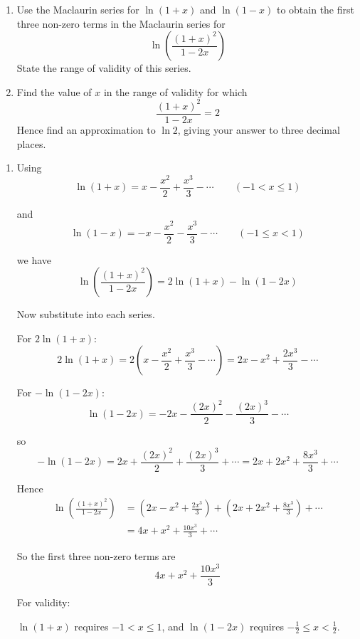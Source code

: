 \documentclass[leqno]{article}
\begin{document}
\begin{enumerate}[
  label=\textbf{\arabic*.},
  leftmargin=*,
  topsep=0pt,
  partopsep=0pt,
  parsep=0pt
]
\newpage

\questionitem

\begin{enumerate}[label=\textbf{(\roman*)}]
  \item Use the Maclaurin series for $\ln(1+x)$ and $\ln(1-x)$ to obtain the first three non-zero terms in the Maclaurin series for
  \[
  \ln\left(\frac{(1+x)^2}{1-2x}\right)
  \]
  State the range of validity of this series.  \\
  \item Find the value of $x$ in the range of validity for which
  \[
  \frac{(1+x)^2}{1-2x}=2
  \]
  Hence find an approximation to $\ln 2$, giving your answer to three decimal places.  \\
\end{enumerate}

\vspace*{10pt}

\begin{djsSolution}
\begin{enumerate}[label=\textbf{(\roman*)}]
\item Using
\[
\ln(1+x)=x-\frac{x^2}{2}+\frac{x^3}{3}-\cdots\qquad (-1<x\leq 1)
\]

and
\[
\ln(1-x)=-x-\frac{x^2}{2}-\frac{x^3}{3}-\cdots\qquad (-1\leq x<1)
\]

we have
\[
\ln\left(\frac{(1+x)^2}{1-2x}\right)=2\ln(1+x)-\ln(1-2x)
\]

Now substitute into each series.

For \(2\ln(1+x)\):
\[
2\ln(1+x)=2\left(x-\frac{x^2}{2}+\frac{x^3}{3}-\cdots\right)
=2x-x^2+\frac{2x^3}{3}-\cdots
\]

For \(-\ln(1-2x)\):
\[
\ln(1-2x)=-2x-\frac{(2x)^2}{2}-\frac{(2x)^3}{3}-\cdots
\]

so
\[
-\ln(1-2x)=2x+\frac{(2x)^2}{2}+\frac{(2x)^3}{3}+\cdots
=2x+2x^2+\frac{8x^3}{3}+\cdots
\]

Hence
\begin{align*}
\ln\left(\frac{(1+x)^2}{1-2x}\right)
&=\left(2x-x^2+\frac{2x^3}{3}\right)+\left(2x+2x^2+\frac{8x^3}{3}\right)+\cdots \\
&=4x+x^2+\frac{10x^3}{3}+\cdots
\end{align*}

So the first three non-zero terms are
\[
4x+x^2+\frac{10x^3}{3}
\]

For validity:

\(\ln(1+x)\) requires \(-1<x\le 1\), and \(\ln(1-2x)\) requires \(-\frac12\le x<\frac12\).


\end{enumerate}
\end{djsSolution}
\end{enumerate}
\end{document}
